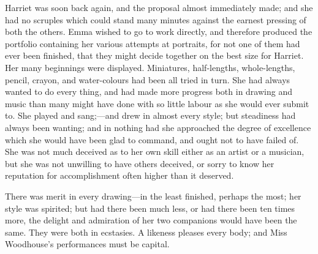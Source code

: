 Harriet was soon back again, and the proposal almost immediately made; and she had no scruples which could stand many minutes against the earnest pressing of both the others. Emma wished to go to work directly, and therefore produced the portfolio containing her various attempts at portraits, for not one of them had ever been finished, that they might decide together on the best size for Harriet. Her many beginnings were displayed. Miniatures, half-lengths, whole-lengths, pencil, crayon, and water-colours had been all tried in turn. She had always wanted to do every thing, and had made more progress both in drawing and music than many might have done with so little labour as she would ever submit to. She played and sang;—and drew in almost every style; but steadiness had always been wanting; and in nothing had she approached the degree of excellence which she would have been glad to command, and ought not to have failed of. She was not much deceived as to her own skill either as an artist or a musician, but she was not unwilling to have others deceived, or sorry to know her reputation for accomplishment often higher than it deserved.

There was merit in every drawing—in the least finished, perhaps the most; her style was spirited; but had there been much less, or had there been ten times more, the delight and admiration of her two companions would have been the same. They were both in ecstasies. A likeness pleases every body; and Miss Woodhouse's performances must be capital.

